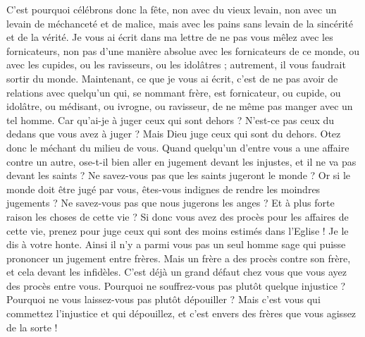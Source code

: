 \begin{multicols}{2}
C'est pourquoi célébrons donc la fête, non avec du vieux levain, non avec un levain de méchanceté et de malice, mais avec les pains sans levain de la sincérité et de la vérité.
Je vous ai écrit dans ma lettre de ne pas vous mêlez avec les fornicateurs,
non pas d’une manière absolue avec les fornicateurs de ce monde, ou avec les cupides, ou les ravisseurs, ou les idolâtres ; autrement, il vous faudrait sortir du monde.
Maintenant, ce que je vous ai écrit, c’est de ne pas avoir de relations avec quelqu’un qui, se nommant frère, est fornicateur, ou cupide, ou idolâtre, ou médisant, ou ivrogne, ou ravisseur, de ne même pas manger avec un tel homme.
Car qu'ai-je à juger ceux qui sont dehors ? N’est-ce pas ceux du dedans que vous avez à juger ?
Mais Dieu juge ceux qui sont du dehors. Otez donc le méchant du milieu de vous.
\VerseOne{}Quand quelqu'un d'entre vous a une affaire contre un autre, ose-t-il bien aller en jugement devant les injustes, et il ne va pas devant les saints ?
Ne savez-vous pas que les saints jugeront le monde ? Or si le monde doit être jugé par vous, êtes-vous indignes de rendre les moindres jugements ?
Ne savez-vous pas que nous jugerons les anges ? Et à plus forte raison les choses de cette vie ?
Si donc vous avez des procès pour les affaires de cette vie, prenez pour juge ceux qui sont des moins estimés dans l'Eglise !
Je le dis à votre honte. Ainsi il n’y a parmi vous pas un seul homme sage qui puisse prononcer un jugement entre frères.
Mais un frère a des procès contre son frère, et cela devant les infidèles.
C'est déjà un grand défaut chez vous que vous ayez des procès entre vous. Pourquoi ne souffrez-vous pas plutôt quelque injustice ? Pourquoi ne vous laissez-vous pas plutôt dépouiller ?
Mais c’est vous qui commettez l’injustice et qui dépouillez, et c’est envers des frères que vous agissez de la sorte !

\end{multicols}
